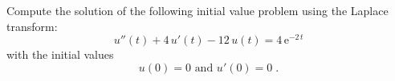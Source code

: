 
{
Compute the solution of the following initial value problem using the Laplace transform:
$$ u''(t)+4\,u'(t)-12\,u(t)=4\,\text{e}^{-2\,t}$$
with the initial values
$$u(0)=0 \text{ and }  u'(0)=0\;.$$

}

